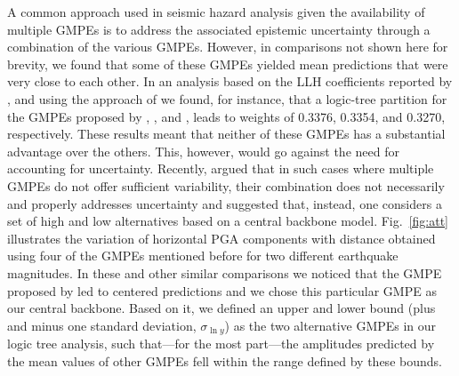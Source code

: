 A common approach used in seismic hazard analysis given the availability of multiple GMPEs is to address the associated epistemic uncertainty through a combination of the various GMPEs. However, in comparisons not shown here for brevity, we found that some of these GMPEs yielded mean predictions that were very close to each other. In an analysis based on the LLH coefficients reported by \citet{Zafarani2014}, and using the approach of \citet{Scherbaum_2009_BSSA} we found, for instance, that a logic-tree partition for the GMPEs proposed by \citet{Kalkan2004}, \citet{Chiou2008}, and \citet{Boore2008}, leads to weights of 0.3376, 0.3354, and 0.3270, respectively. These results meant that neither of these GMPEs has a substantial advantage over the others. This, however, would go against the need for accounting for uncertainty. Recently, \citet{Atkinson2014} argued that in such cases where multiple GMPEs do not offer sufficient variability, their combination does not necessarily and properly addresses uncertainty and suggested that, instead, one considers a set of high and low alternatives based on a central backbone model. Fig.~\ref{fig:att} illustrates the variation of horizontal PGA components with distance obtained using four of the GMPEs mentioned before for two different earthquake magnitudes. In these and other similar comparisons we noticed that the GMPE proposed by \citet{Kalkan2004} led to centered predictions and we chose this particular GMPE as our central backbone. Based on it, we defined an upper and lower bound (plus and minus one standard deviation, $\sigma_{\ln y}$) as the two alternative GMPEs in our logic tree analysis, such that---for the most part---the amplitudes predicted by the mean values of other GMPEs fell within the range defined by these bounds.

